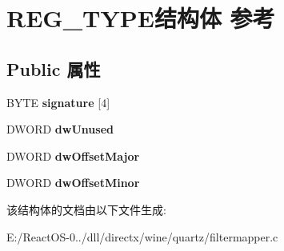 \hypertarget{struct_r_e_g___t_y_p_e}{}\section{R\+E\+G\+\_\+\+T\+Y\+P\+E结构体 参考}
\label{struct_r_e_g___t_y_p_e}
\subsection*{Public 属性}
\begin{DoxyCompactItemize}
\item 
\mbox{\label{struct_r_e_g___t_y_p_e_a287416f0babe6a9bd9b02f079422067e}} 
B\+Y\+TE {\bfseries signature} \mbox{[}4\mbox{]}
\item 
\mbox{\label{struct_r_e_g___t_y_p_e_acc991009efadfb610b0f43cbe1b2e95e}} 
D\+W\+O\+RD {\bfseries dw\+Unused}
\item 
\mbox{\label{struct_r_e_g___t_y_p_e_a70c7c800a6470c182f15476a0dcccda0}} 
D\+W\+O\+RD {\bfseries dw\+Offset\+Major}
\item 
\mbox{\label{struct_r_e_g___t_y_p_e_ae8c035a819129bb722559d94f58edfb9}} 
D\+W\+O\+RD {\bfseries dw\+Offset\+Minor}
\end{DoxyCompactItemize}


该结构体的文档由以下文件生成\+:\begin{DoxyCompactItemize}
\item 
E\+:/\+React\+O\+S-\/0../dll/directx/wine/quartz/filtermapper.\+c\end{DoxyCompactItemize}
